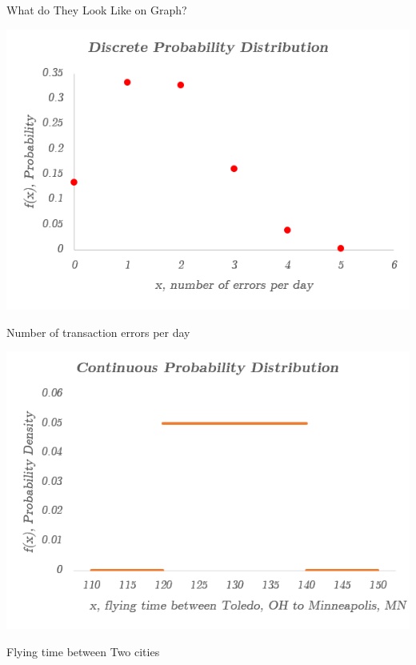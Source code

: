 \documentclass{beamer}
\begin{document}
\begin{frame}{What do They Look Like on Graph?}

\begin{multicols}{2}

\includegraphics[scale=0.33]{images/section4DiscreteExample.png}

\begin{scriptsize}
\begin{center}
Number of transaction errors per day

\end{center}\end{scriptsize}

\includegraphics[scale=0.33]{images/section4ContinuousExample.png}

\begin{scriptsize}
\begin{center}
Flying time between Two cities


\end{center}
\end{scriptsize}
\end{multicols}
\end{frame}
\end{document}
